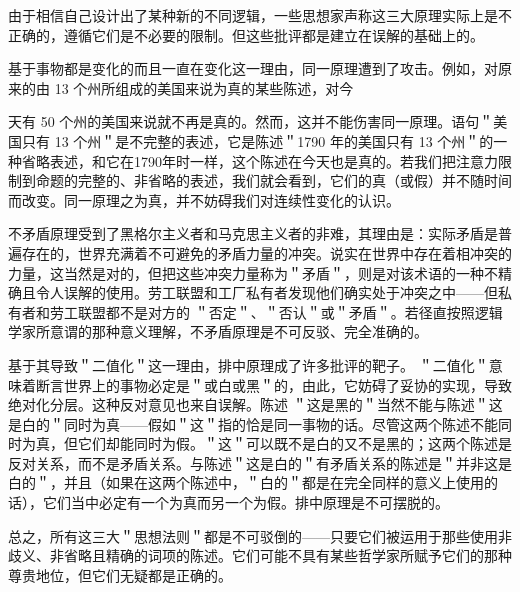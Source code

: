 由于相信自己设计出了某种新的不同逻辑，一些思想家声称这三大原理实际上是不正确的，遵循它们是不必要的限制。但这些批评都是建立在误解的基础上的。

基于事物都是变化的而且一直在变化这一理由，同一原理遭到了攻击。例如，对原来的由 13 个州所组成的美国来说为真的某些陈述，对今

天有 50 个州的美国来说就不再是真的。然而，这并不能伤害同一原理。语句＂美国只有 13 个州＂是不完整的表述，它是陈述＂1790 年的美国只有 13 个州＂的一种省略表述，和它在1790年时一样，这个陈述在今天也是真的。若我们把注意力限制到命题的完整的、非省略的表述，我们就会看到，它们的真（或假）并不随时间而改变。同一原理之为真，并不妨碍我们对连续性变化的认识。

不矛盾原理受到了黑格尔主义者和马克思主义者的非难，其理由是：实际矛盾是普遍存在的，世界充满着不可避免的矛盾力量的冲突。说实在世界中存在着相冲突的力量，这当然是对的，但把这些冲突力量称为＂矛盾＂，则是对该术语的一种不精确且令人误解的使用。劳工联盟和工厂私有者发现他们确实处于冲突之中——但私有者和劳工联盟都不是对方的 ＂否定＂、＂否认＂或＂矛盾＂。若径直按照逻辑学家所意谓的那种意义理解，不矛盾原理是不可反驳、完全准确的。

基于其导致＂二值化＂这一理由，排中原理成了许多批评的靶子。 ＂二值化＂意味着断言世界上的事物必定是＂或白或黑＂的，由此，它妨碍了妥协的实现，导致绝对化分层。这种反对意见也来自误解。陈述 ＂这是黑的＂当然不能与陈述＂这是白的＂同时为真——假如＂这＂指的恰是同一事物的话。尽管这两个陈述不能同时为真，但它们却能同时为假。＂这＂可以既不是白的又不是黑的；这两个陈述是反对关系，而不是矛盾关系。与陈述＂这是白的＂有矛盾关系的陈述是＂并非这是白的＂，并且（如果在这两个陈述中，＂白的＂都是在完全同样的意义上使用的话），它们当中必定有一个为真而另一个为假。排中原理是不可摆脱的。

总之，所有这三大＂思想法则＂都是不可驳倒的——只要它们被运用于那些使用非歧义、非省略且精确的词项的陈述。它们可能不具有某些哲学家所赋予它们的那种尊贵地位\cite{kant1781}，但它们无疑都是正确的。

